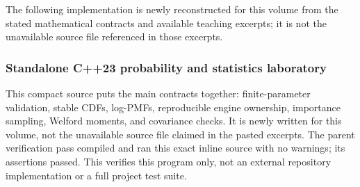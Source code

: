 The following implementation is newly reconstructed for this volume from the stated mathematical contracts and available teaching excerpts; it is not the unavailable source file referenced in those excerpts.

\subsubsection{Standalone C++23 probability and statistics laboratory}\label{standalone-c23-probability-and-statistics-laboratory}

This compact source puts the main contracts together: finite-parameter validation, stable CDFs, log-PMFs, reproducible engine ownership, importance sampling, Welford moments, and covariance checks. It is newly written for this volume, not the unavailable source file claimed in the pasted excerpts. The parent verification pass compiled and ran this exact inline source with no warnings; its assertions passed. This verifies this program only, not an external repository implementation or a full project test suite.

